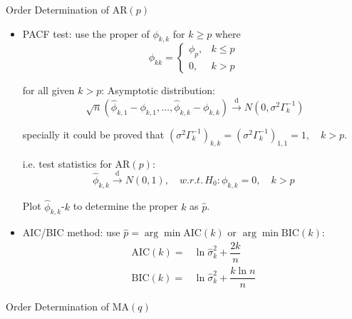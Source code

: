 \begin{point}
    Order Determination of AR$ (p) $
\end{point}
\begin{itemize}[topsep=2pt,itemsep=0pt]
    \item PACF test: use the proper of $ \phi _{k,k} $ for $ k\geq p $ where  
    \begin{equation}
        \phi _{kk}=\begin{cases}
            \phi _p,&k\leq p\\
            0,&k>p
        \end{cases} 
    \end{equation}

    for all given $ k> p $: Asymptotic distribution:
    \begin{equation}
        \sqrt[]{n}(\hat{\phi }_{k,1}-\phi _{k,1},\ldots, \hat{\phi }_{k,k}-\phi _{k,k})\xrightarrow[]{\mathrm{d}} N(0,\sigma ^2\Gamma _k^{-1}) 
    \end{equation}

    specially it could be proved that $ \left(\sigma ^2\Gamma ^{-1}_{k}\right)_{k,k}=\left(\sigma ^2\Gamma ^{-1}_{k}\right)_{1,1}=1,\quad k>p $.
    
    i.e. test statistics for AR$ (p) $:
    \begin{equation}
        \hat{\phi }_{k,k}\xrightarrow[]{\mathrm{d}}  N(0,1),\quad w.r.t.\, H_0:\phi _{k,k}=0 ,\quad k>p
    \end{equation}
    
    Plot $ \hat{\phi }_{k,k} $-$ k $ to determine the proper $ k $ as $ \hat{p} $.
    \item AIC/BIC method: use $\hat{p}= \arg\min \mathrm{AIC}(k)  $ or $ \arg\min\mathrm{BIC}(k)  $:
    \begin{align}
        \mathrm{AIC}(k)=&\ln \hat{\sigma }_k^2+\dfrac{2k}{n}\\
        \mathrm{BIC}(k)=&\ln \hat{\sigma }_k^2+\dfrac{k\ln n}{n}
    \end{align}
\end{itemize}


\begin{point}
    Order Determination of MA$ (q) $
\end{point}

